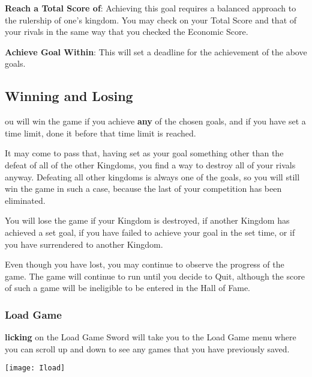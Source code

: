 \textbf{Reach a Total Score of}: Achieving this goal requires a balanced approach to the rulership of one’s kingdom. You may check on your Total Score and that of your rivals in the same way that you checked the Economic Score.

\textbf{Achieve Goal Within}: This will set a deadline for the achievement of the above goals.

\subsection{\textsf{Winning and Losing}}


ou will win the game if you achieve \textbf{any} of the chosen goals, and if you have set a time limit, done it before that time limit is reached.

It may come to pass that, having set as your goal something other than the defeat of all of the other Kingdoms, you find a way to destroy all of your rivals anyway. Defeating all other kingdoms is always one of the goals, so you will still win the game in such a case, because the last of your competition has been eliminated.

You will lose the game if your Kingdom is destroyed, if another Kingdom has achieved a set goal, if you have failed to achieve your goal in the set time, or if you have surrendered to another Kingdom.


Even though you have lost, you may continue to observe the progress of the game. The game will continue to run until you decide to Quit, although the score of such a game will be ineligible to be entered in the Hall of Fame.

\subsubsection{\textsf{Load Game}}


\textbf{licking} on the Load Game Sword will take you to the Load Game menu where you can scroll up and down to see any games that you have previously saved.

\begin{center}
    \texttt{[image: Iload]} %
\end{center}

